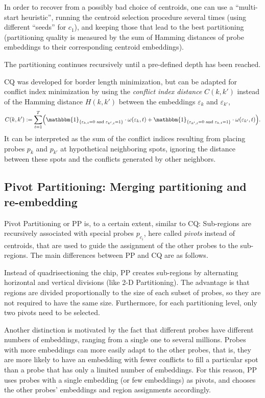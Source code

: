 \documentclass{w-edbk}
\newcommand{\eps}{\varepsilon}
\newcommand{\Ind}[1]{\mathbbm{1}_{\{{#1}\}}}
\begin{document}
In order to recover from a possibly bad choice of centroids, one can
use a ``multi-start heuristic'', running the centroid selection
procedure several times (using different ``seeds'' for $c_1$), and
keeping those that lead to the best partitioning (partitioning quality
is measured by the sum of Hamming distances of probe embeddings to
their corresponding centroid embeddings).

The partitioning continues recursively until a pre-defined depth has been
reached.

CQ was developed for border length minimization, but can be adapted
for conflict index minimization by using the \emph{conflict index
  distance} $C(k,k')$ instead of the Hamming distance $H(k,k')$
between the embeddings $\eps_k$ and $\eps_{k'}$,
\begin{equation}
\label{eq:ci_dist}
C(k,k') := \sum_{t=1}^{T}
  \Bigl(
    \Ind{\eps_{k,t}=0 \text{ and } \eps_{k',t}=1}
    \cdot \omega(\eps_{k},t)
    +
    \Ind{\eps_{k',t}=0 \text{ and } \eps_{k,t}=1}
    \cdot \omega(\eps_{k'},t)
  \Bigr).
\end{equation}
It can be interpreted as the sum of the conflict indices resulting
from placing probes $p_k$ and $p_{k'}$ at hypothetical neighboring
spots, ignoring the distance between these spots and the conflicts
generated by other neighbors.


\subsection{Pivot Partitioning: Merging partitioning and re-embedding}

Pivot Partitioning or PP \citep{Carvalho2006} is, to a certain extent,
similar to CQ: Sub-regions are recursively associated with special
probes $p_{c_i}$, here called \emph{pivots} instead of centroids, that
are used to guide the assignment of the other probes to the
sub-regions.  The main differences between PP and CQ are as follows.

Instead of quadrisectioning the chip, PP creates sub-regions by
alternating horizontal and vertical divisions (like 2-D Partitioning).
The advantage is that regions are divided proportionally to the size
of each subset of probes, so they are not required to have the same
size. Furthermore, for each partitioning level, only two pivots need
to be selected.

Another distinction is motivated by the fact that different probes
have different numbers of embeddings, ranging from a single one to
several millions.  Probes with more embeddings can more easily adapt
to the other probes, that is, they are more likely to have an
embedding with fewer conflicts to fill a particular spot than a probe
that has only a limited number of embeddings. For this reason, PP uses
probes with a single embedding (or few embeddings) as pivots, and
chooses the other probes' embeddings and region assignments accordingly.
\end{document}
